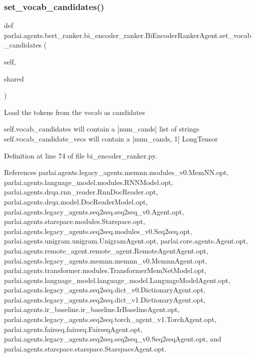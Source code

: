\subsubsection{\texorpdfstring{set\+\_\+vocab\+\_\+candidates()}{set\_vocab\_candidates()}}
{\footnotesize\ttfamily def parlai.\+agents.\+bert\+\_\+ranker.\+bi\+\_\+encoder\+\_\+ranker.\+Bi\+Encoder\+Ranker\+Agent.\+set\+\_\+vocab\+\_\+candidates (\begin{DoxyParamCaption}\item[{}]{self,  }\item[{}]{shared }\end{DoxyParamCaption})}

\begin{DoxyVerb}Load the tokens from the vocab as candidates

self.vocab_candidates will contain a [num_cands] list of strings
self.vocab_candidate_vecs will contain a [num_cands, 1] LongTensor
\end{DoxyVerb}
 

Definition at line 74 of file bi\+\_\+encoder\+\_\+ranker.\+py.



References parlai.\+agents.\+legacy\+\_\+agents.\+memnn.\+modules\+\_\+v0.\+Mem\+N\+N.\+opt, parlai.\+agents.\+language\+\_\+model.\+modules.\+R\+N\+N\+Model.\+opt, parlai.\+agents.\+drqa.\+rnn\+\_\+reader.\+Rnn\+Doc\+Reader.\+opt, parlai.\+agents.\+drqa.\+model.\+Doc\+Reader\+Model.\+opt, parlai.\+agents.\+legacy\+\_\+agents.\+seq2seq.\+seq2seq\+\_\+v0.\+Agent.\+opt, parlai.\+agents.\+starspace.\+modules.\+Starspace.\+opt, parlai.\+agents.\+legacy\+\_\+agents.\+seq2seq.\+modules\+\_\+v0.\+Seq2seq.\+opt, parlai.\+agents.\+unigram.\+unigram.\+Unigram\+Agent.\+opt, parlai.\+core.\+agents.\+Agent.\+opt, parlai.\+agents.\+remote\+\_\+agent.\+remote\+\_\+agent.\+Remote\+Agent\+Agent.\+opt, parlai.\+agents.\+legacy\+\_\+agents.\+memnn.\+memnn\+\_\+v0.\+Memnn\+Agent.\+opt, parlai.\+agents.\+transformer.\+modules.\+Transformer\+Mem\+Net\+Model.\+opt, parlai.\+agents.\+language\+\_\+model.\+language\+\_\+model.\+Language\+Model\+Agent.\+opt, parlai.\+agents.\+legacy\+\_\+agents.\+seq2seq.\+dict\+\_\+v0.\+Dictionary\+Agent.\+opt, parlai.\+agents.\+legacy\+\_\+agents.\+seq2seq.\+dict\+\_\+v1.\+Dictionary\+Agent.\+opt, parlai.\+agents.\+ir\+\_\+baseline.\+ir\+\_\+baseline.\+Ir\+Baseline\+Agent.\+opt, parlai.\+agents.\+legacy\+\_\+agents.\+seq2seq.\+torch\+\_\+agent\+\_\+v1.\+Torch\+Agent.\+opt, parlai.\+agents.\+fairseq.\+fairseq.\+Fairseq\+Agent.\+opt, parlai.\+agents.\+legacy\+\_\+agents.\+seq2seq.\+seq2seq\+\_\+v0.\+Seq2seq\+Agent.\+opt, and parlai.\+agents.\+starspace.\+starspace.\+Starspace\+Agent.\+opt.

